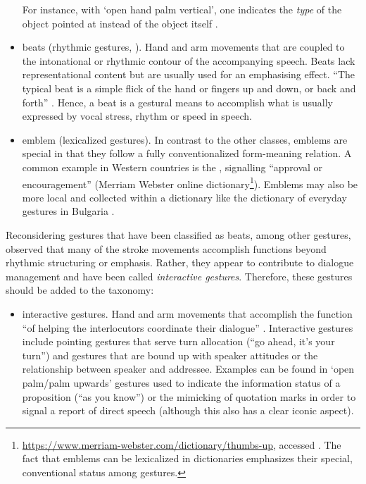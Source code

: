 \documentclass[output=paper
                ,modfonts
                ,nonflat
	        ,collection
	        ,collectionchapter
	        ,collectiontoclongg
 	        ,biblatex
                ,babelshorthands
                ,newtxmath
                ,draftmode
                ,colorlinks, citecolor=brown
]{./langsci/langscibook}
\begin{document}
\begin{itemize}
%
For instance, with \enquote*{open hand palm vertical}, one indicates the \emph{type} of the object pointed at instead of the object itself \citep[]{Kendon:Versante:2003}.
\item beats  (rhythmic gestures, ). Hand and arm movements that are coupled to the intonational or rhythmic contour of the accompanying speech. Beats lack representational content but are usually used for an emphasising effect. \enquote{The typical beat is a simple flick of the hand or fingers up and down, or back and forth} \citep[]{McNeill:1992}. Hence, a beat is a gestural means to accomplish what is usually expressed by vocal stress, rhythm or speed in speech. 
\item emblem (lexicalized gestures). In contrast to the other classes, emblems are special in that they follow a fully conventionalized form-meaning relation. A common example in Western countries is the , signalling \enquote{approval or encouragement} (Merriam Webster online dictionary\footnote{\url{https://www.merriam-webster.com/dictionary/thumbs-up}, accessed . The fact that emblems can be lexicalized in dictionaries emphasizes their special, conventional status among gestures.}). Emblems may also be more local and collected within a dictionary like the dictionary of everyday gestures in Bulgaria \citep{Kolarova:2011}.
\end{itemize}


Reconsidering gestures that have been classified as beats, among other gestures, \citet{Bavelas:Chovil:Lawrie:Wade:1992} observed that many of the stroke movements accomplish functions beyond rhythmic structuring or emphasis.
%
Rather, they appear to contribute to dialogue management and have been called \emph{interactive gestures}.
%
Therefore, these gestures should be added to the taxonomy:

\begin{itemize}
\item interactive gestures.  Hand and arm movements that accomplish the function \enquote{of helping the interlocutors coordinate their dialogue} \citep[]{Bavelas:Chovil:Coates:Roe:1995}. Interactive gestures include pointing gestures that serve turn allocation (\enquote{go ahead, it's your turn}) and gestures that are bound up with speaker attitudes or the relationship between speaker and addressee. Examples can be found in \enquote*{open palm/palm upwards} gestures used to indicate the information status of a proposition (\enquote{as you know}) or the mimicking of quotation marks in order to signal a report of direct speech (although this also has a clear iconic aspect).
\end{itemize}
\end{document}
